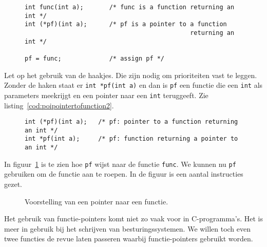 \begin{figure}[!ht]
\begin{lstlisting}[caption=Een functie en een pointer naar een functie.,label=cod:poipointertofunction]
int func(int a);       /* func is a function returning an int */
int (*pf)(int a);      /* pf is a pointer to a function
                                             returning an int */

pf = func;             /* assign pf */
\end{lstlisting}
\end{figure}

Let op het gebruik van de haakjes. Die zijn nodig om prioriteiten vast te leggen. Zonder de haken staat er \texttt{int *pf(int a)} en dan is \texttt{pf} een functie die een \texttt{int} als parameters meekrijgt en een pointer naar een \texttt{int} teruggeeft. Zie listing~\ref{cod:poipointertofunction2}.

\begin{figure}[H]
\begin{lstlisting}[caption=Een functie en een pointer naar een functie.,label=cod:poipointertofunction2]
int (*pf)(int a);   /* pf: pointer to a function returning an int */
int *pf(int a);     /* pf: function returning a pointer to an int */
\end{lstlisting}
\end{figure}

In figuur~\ref{fig:poipointertofunction} is te zien hoe \texttt{pf} wijst naar de functie \texttt{func}. We kunnen nu \texttt{pf} gebruiken om de functie aan te roepen. In de figuur is een aantal instructies gezet.

\begin{figure}[!ht]
\centering
{}
\caption{Voorstelling van een pointer naar een functie.}
\label{fig:poipointertofunction}
\end{figure}

Het gebruik van functie-pointers komt niet zo vaak voor in C-programma's. Het is meer in gebruik bij het schrijven van besturingssystemen. We willen toch even twee functies de revue laten passeren waarbij functie-pointers gebruikt worden.

